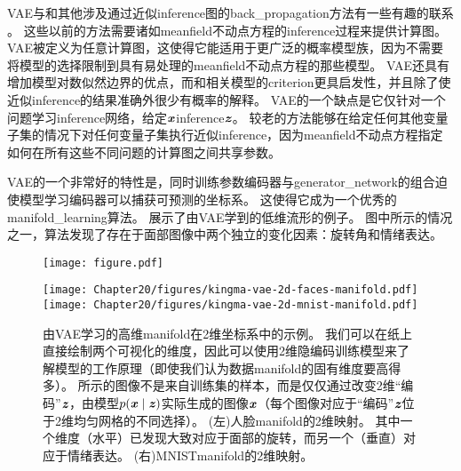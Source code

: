 \gls{VAE}与和其他涉及通过近似\gls{inference}图的\gls{back_propagation}方法有一些有趣的联系 \citep{Goodfellow-et-al-NIPS2013,Stoyanov2011,brakel13a}。
这些以前的方法需要诸如\gls{meanfield}不动点方程的\gls{inference}过程来提供计算图。
\gls{VAE}被定义为任意计算图，这使得它能适用于更广泛的概率模型族，因为不需要将模型的选择限制到具有易处理的\gls{meanfield}不动点方程的那些模型。
\gls{VAE}还具有增加模型对数似然边界的优点，而和相关模型的\gls{criterion}更具启发性，并且除了使近似\gls{inference}的结果准确外很少有概率的解释。
\gls{VAE}的一个缺点是它仅针对一个问题学习\gls{inference}网络，给定$\boldsymbol{\mathit{x}}$\gls{inference}$\boldsymbol{\mathit{z}}$。
较老的方法能够在给定任何其他变量子集的情况下对任何变量子集执行近似\gls{inference}，因为\gls{meanfield}不动点方程指定如何在所有这些不同问题的计算图之间共享参数。


\gls{VAE}的一个非常好的特性是，同时训练参数编码器与\gls{generator_network}的组合迫使模型学习编码器可以捕获可预测的坐标系。
这使得它成为一个优秀的\gls{manifold_learning}算法。
展示了由\gls{VAE}学到的低维流形的例子。
图中所示的情况之一，算法发现了存在于面部图像中两个独立的变化因素：旋转角和情绪表达。


\begin{figure}[!htb]
\ifOpenSource
\centerline{\texttt{[image: figure.pdf]}}
\else
\centerline{
\texttt{[image: Chapter20/figures/kingma-vae-2d-faces-manifold.pdf]}
\texttt{[image: Chapter20/figures/kingma-vae-2d-mnist-manifold.pdf]}
}
\fi
\caption{由\gls{VAE}学习的高维\gls{manifold}在2维坐标系中的示例\citep{Kingma+Welling-ICLR2014}。
我们可以在纸上直接绘制两个可视化的维度，因此可以使用2维隐编码训练模型来了解模型的工作原理（即使我们认为数据\gls{manifold}的固有维度要高得多）。
所示的图像不是来自训练集的样本，而是仅仅通过改变2维``编码''$\boldsymbol{\mathit{z}}$，由模型$p(\boldsymbol{\mathit{x}} \mid \boldsymbol{\mathit{z}})$实际生成的图像$\boldsymbol{\mathit{x}}$（每个图像对应于``编码''$\boldsymbol{\mathit{z}}$位于2维均匀网格的不同选择）。
(左)人脸\gls{manifold}的2维映射。 其中一个维度（水平）已发现大致对应于面部的旋转，而另一个（垂直）对应于情绪表达。
(右)MNIST\gls{manifold}的2维映射。
}
\label{fig:chap20_kingma-vae-2d-faces-manifold}
\end{figure}

\subsection{}
\label{sec:generative_adversarial_networks}

